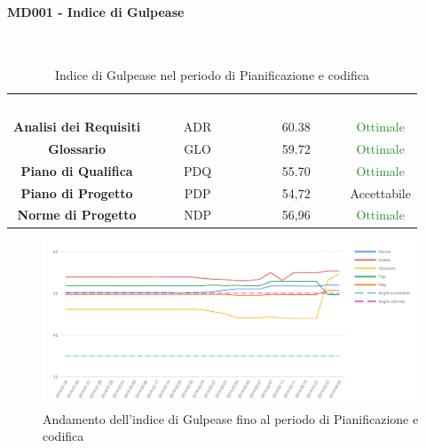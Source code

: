 \paragraph{MD001 - Indice di Gulpease}\mbox{}\\[0,3cm]
\begin{table}[H]
	\centering
	\begin{tabular}{cccc}
	\rowcolor{greySWEight}
	\textcolor{white}{\textbf{Documento}} & 
	\textcolor{white}{\textbf{Abbreviazione}} &
	\textcolor{white}{\textbf{Valore Indice}}&
	\textcolor{white}{\textbf{Riscontro}}\\
	
	\textbf{Analisi dei Requisiti} & ADR & 60.38 & \textcolor{ForestGreen}{Ottimale} \\
	\textbf{Glossario} & GLO & 59.72 & \textcolor{ForestGreen}{Ottimale} \\
	\textbf{Piano di Qualifica} & PDQ & 55.70 & \textcolor{ForestGreen}{Ottimale} \\
	\textbf{Piano di Progetto} & PDP & 54,72 & \textcolor{YellowOrange}{Accettabile} \\
	\textbf{Norme di Progetto} & NDP & 56,96 & \textcolor{ForestGreen}{Ottimale} \\

	\end{tabular}
	\caption{Indice di Gulpease nel periodo di Pianificazione e codifica}
\end{table}

\begin{figure}[H]
	\includegraphics[width=1\linewidth]{sez/App_Esito/Qualifica/graph/QU_Storico_Gulp.pdf}
	\caption{Andamento dell'indice di Gulpease fino al periodo di Pianificazione e codifica}
\end{figure}